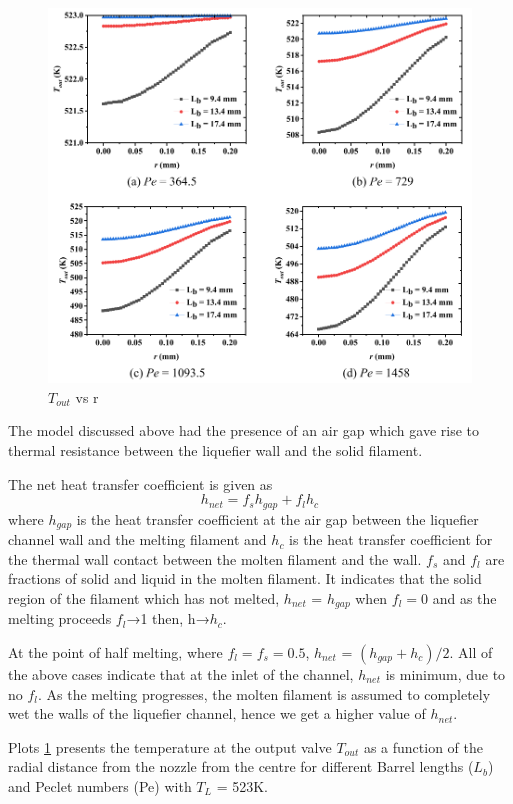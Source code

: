 \documentclass{report}
\begin{document}
{\begin{figure}
    \includegraphics[width=1\linewidth]{Tout vs r.png}
    \caption{$T_{out}$ vs r}
    \label{fig:Tout vs r}
\end{figure}

The model discussed above had the presence of an air gap which gave rise to thermal resistance between the liquefier wall and the solid filament.

The net heat transfer coefficient is given as \[h_{net} = f_s h_{gap} + f_lh_c\]where $h_{gap}$ is the heat transfer coefficient at the air gap between the liquefier channel wall and the melting filament and $h_c$ is the heat transfer coefficient for the thermal wall contact between the molten filament and the wall. $f_s$ and $f_l$ are fractions of solid and liquid in the molten filament. It indicates that the solid region of the filament which has not melted, $h_{net}$ = $h_{gap}$ when $f_l = 0$ and as the melting proceeds $f_l$→1 then, h→$h_c$.

At the point of half melting, where $f_l = f_s = 0.5$, $h_{net}$ = $(h_{gap} + h_c)/2$. All of the above cases indicate that at the inlet of the channel, $h_{net}$ is minimum, due to no $f_l$. As the melting progresses, the molten filament is assumed to completely wet the walls of the liquefier channel, hence we get a higher value of $h_{net}$.

Plots \ref{fig:Tout vs r} presents the temperature at the output valve $T_{out}$ as a function of the radial distance from the nozzle from the centre for different Barrel lengths ($L_b$) and Peclet numbers (Pe) with $T_L$ = 523K.

}
\end{document}
